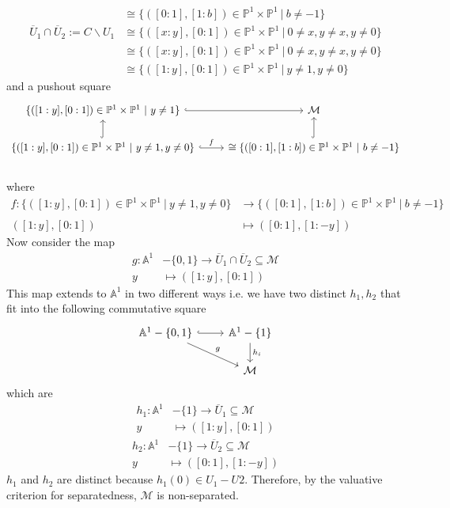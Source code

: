 \begin{example}
\begin{align*}
	&\cong\{([0:1],[1:b])\in\mathbb{P}^1\times\mathbb{P}^1~|~b\neq -1\}\\
	\overline{U}_1\cap\overline{U}_2:=C\backslash U_1&\cong\{([x:y],[0:1])\in\mathbb{P}^1\times\mathbb{P}^1~|~0\neq x,y\neq x,y\neq 0\}\\
	&\cong\{([x:y],[0:1])\in\mathbb{P}^1\times\mathbb{P}^1~|~0\neq x,y\neq x,y\neq 0\}\\
	&\cong\{([1:y],[0:1])\in\mathbb{P}^1\times\mathbb{P}^1~|~y\neq 1,y\neq 0\}
\end{align*}
and a pushout square
\begin{displaymath}
\begin{tikzcd}
	\{([1:y],[0:1])\in\mathbb{P}^1\times\mathbb{P}^1~|~y\neq 1\}
  \arrow[hookrightarrow]{r} & \mathcal{M} \\
	\{([1:y],[0:1])\in\mathbb{P}^1\times\mathbb{P}^1~|~y\neq 1,y\neq 0\} 
  \arrow[hookrightarrow]{u} \arrow[hookrightarrow]{r}{f} 
  & \cong\{([0:1],[1:b])\in\mathbb{P}^1\times\mathbb{P}^1~|~b\neq -1\} 
  \arrow[hookrightarrow]{u} 
\end{tikzcd} 
\end{displaymath}\\
where 
\begin{align*}
	f:\{([1:y],[0:1])\in\mathbb{P}^1\times\mathbb{P}^1~|~y\neq 1,y\neq 0\}&\rightarrow \{([0:1],[1:b])\in\mathbb{P}^1\times\mathbb{P}^1~|~b\neq -1\}\\
	&~~\\
	([1:y],[0:1])&\mapsto ([0:1],[1:-y])
\end{align*}
Now consider the map
\begin{align*}
	g:\mathbb{A}^1&-\{0,1\} \longrightarrow \overline{U}_1 \cap\overline{U}_2\subseteq \mathcal{M}\\
	y&\mapsto ([1:y],[0:1])
\end{align*}
This map extends to $\mathbb{A}^1$ in two different ways i.e. we have two distinct $h_1,h_2$ that fit into the following commutative square 
\begin{displaymath}
\begin{tikzcd}
	\mathbb{A}^1-\{0,1\} \arrow[hookrightarrow]{r}  \arrow{rd}{g} 
  & \mathbb{A}^1 -\{1\}\arrow{d}{h_{i}} \\
    & \mathcal{M} 
\end{tikzcd} 
\end{displaymath}
which are
\begin{align*}
	h_1:\mathbb{A}^1&-\{1\} \longrightarrow \overline{U}_1\subseteq \mathcal{M}\\
	y&\mapsto ([1:y],[0:1])
\end{align*}
\begin{align*}
	h_2:\mathbb{A}^1&-\{1\}\longrightarrow \overline{U}_2\subseteq \mathcal{M}\\
	y&\mapsto ([0:1],[1:-y])
\end{align*}
$h_1$ and $h_2$ are distinct because $h_1(0)\in U_1-U2$. Therefore, by the valuative criterion for separatedness, $\mathcal{M}$ is non-separated.
\end{example}